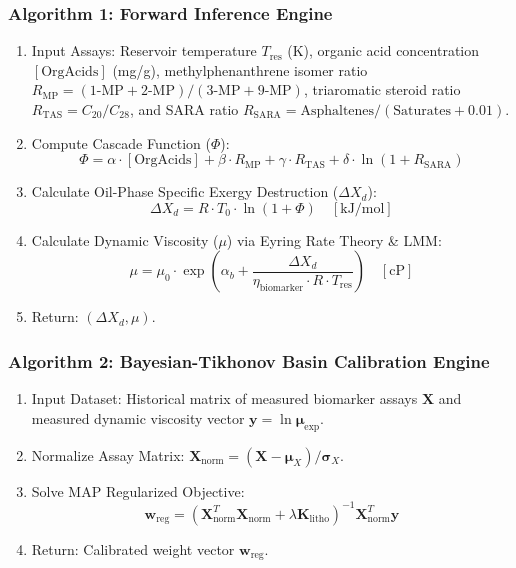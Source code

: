 \documentclass[review,12pt]{elsarticle}
\begin{document}
\subsubsection{Algorithm 1: Forward Inference Engine}
\begin{enumerate}
    \item Input Assays: Reservoir temperature $T_{\text{res}}$ (K), organic acid concentration $[\text{OrgAcids}]$ (mg/g), methylphenanthrene isomer ratio $R_{\text{MP}} = (1\text{-MP}+2\text{-MP})/(3\text{-MP}+9\text{-MP})$, triaromatic steroid ratio $R_{\text{TAS}} = C_{20}/C_{28}$, and SARA ratio $R_{\text{SARA}} = \text{Asphaltenes}/(\text{Saturates} + 0.01)$.
    \item Compute Cascade Function ($\Phi$):
    $$\Phi = \alpha \cdot [\text{OrgAcids}] + \beta \cdot R_{\text{MP}} + \gamma \cdot R_{\text{TAS}} + \delta \cdot \ln(1 + R_{\text{SARA}})$$
    \item Calculate Oil-Phase Specific Exergy Destruction ($\Delta X_d$):
    $$\Delta X_d = R \cdot T_0 \cdot \ln(1 + \Phi) \quad [\text{kJ/mol}]$$
    \item Calculate Dynamic Viscosity ($\mu$) via Eyring Rate Theory \& LMM:
    $$\mu = \mu_0 \cdot \exp\left( \alpha_b + \frac{\Delta X_d}{\eta_{\text{biomarker}} \cdot R \cdot T_{\text{res}}} \right) \quad [\text{cP}]$$
    \item Return: $(\Delta X_d, \mu)$.
\end{enumerate}

\subsubsection{Algorithm 2: Bayesian-Tikhonov Basin Calibration Engine}
\begin{enumerate}
    \item Input Dataset: Historical matrix of measured biomarker assays $\mathbf{X}$ and measured dynamic viscosity vector $\mathbf{y} = \ln \boldsymbol{\mu}_{\text{exp}}$.
    \item Normalize Assay Matrix: $\mathbf{X}_{\text{norm}} = (\mathbf{X} - \boldsymbol{\mu}_X) / \boldsymbol{\sigma}_X$.
    \item Solve MAP Regularized Objective:
    $$\mathbf{w}_{\text{reg}} = \left( \mathbf{X}_{\text{norm}}^T \mathbf{X}_{\text{norm}} + \lambda \mathbf{K}_{\text{litho}} \right)^{-1} \mathbf{X}_{\text{norm}}^T \mathbf{y}$$
    \item Return: Calibrated weight vector $\mathbf{w}_{\text{reg}}$.
\end{enumerate}
\end{document}

